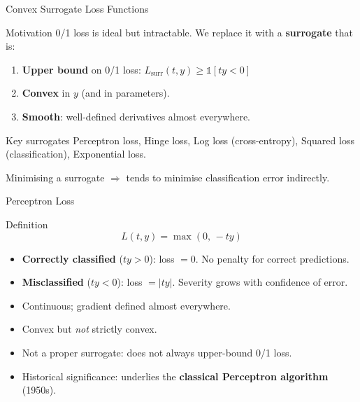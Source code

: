 \begin{frame}{Convex Surrogate Loss Functions}
  \begin{block}{Motivation}
    0/1 loss is ideal but intractable. We replace it with a \textbf{surrogate} that is:
  \end{block}

  \vspace{.3em}
  \begin{enumerate}
    \item \textbf{Upper bound} on 0/1 loss:
      $L_{\text{surr}}(t,y) \geq \mathbb{1}[ty<0]$
    \item \textbf{Convex} in $y$ (and in parameters).
    \item \textbf{Smooth}: well-defined derivatives almost everywhere.
  \end{enumerate}

  \vspace{.5em}
  \begin{exampleblock}{Key surrogates}
    Perceptron loss, Hinge loss, Log loss (cross-entropy), Squared loss (classification), Exponential loss.
  \end{exampleblock}

  \vspace{.3em}
  Minimising a surrogate $\Rightarrow$ tends to minimise classification error indirectly.
\end{frame}

\begin{frame}{Perceptron Loss}
  \begin{block}{Definition}
    \[
      L(t,y) = \max(0,\,-ty)
    \]
  \end{block}

  \begin{itemize}
    \item \textbf{Correctly classified} ($ty>0$): loss $= 0$. No penalty for correct predictions.
    \item \textbf{Misclassified} ($ty<0$): loss $= |ty|$. Severity grows with confidence of error.
    \item Continuous; gradient defined almost everywhere.
    \item Convex but \emph{not} strictly convex.
    \item \alert{Not a proper surrogate}: does not always upper-bound 0/1 loss.
    \item Historical significance: underlies the \textbf{classical Perceptron algorithm} (1950s).
  \end{itemize}
\end{frame}


